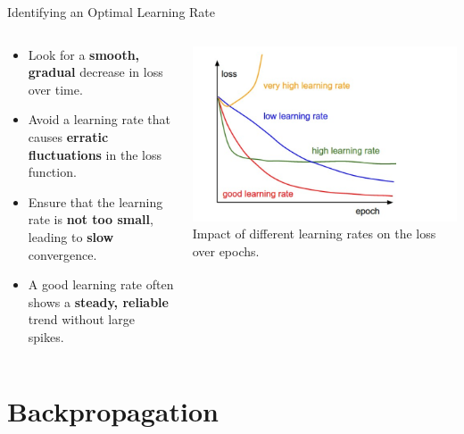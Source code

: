 \documentclass[serif, aspectratio=169]{beamer}
\begin{document}
\begin{frame}{Identifying an Optimal Learning Rate}
    \begin{columns}[T] %
        \begin{column}{0.5\textwidth}
            \begin{itemize}
                \item Look for a \textbf{smooth, gradual} decrease in loss over time.
                \item Avoid a learning rate that causes \textbf{erratic fluctuations} in the loss function.
                \item Ensure that the learning rate is \textbf{not too small}, leading to \textbf{slow} convergence.
                \item A good learning rate often shows a \textbf{steady, reliable} trend without large spikes.
            \end{itemize}
        \end{column}
        \begin{column}{0.5\textwidth}
            \begin{center}
                \includegraphics[width=\textwidth, keepaspectratio]{pic/1_rcmvCjQvsxrJi8Y4HpGcCw.png}\\{Impact of different learning rates on the loss over epochs.}
            \end{center}
        \end{column}
    \end{columns}
\end{frame}



\section{Backpropagation}
\end{document}
